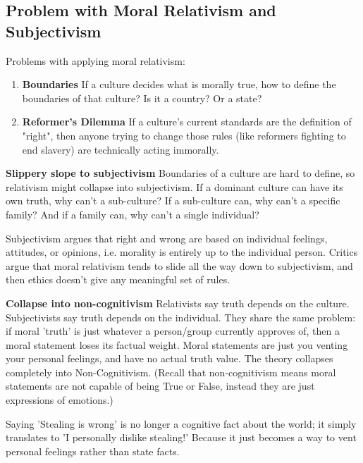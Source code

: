 \documentclass[12pt]{article}
\begin{document}
\subsection{Problem with Moral Relativism and Subjectivism}
Problems with applying moral relativism:
\begin{enumerate}
    \item \textbf{Boundaries} If a culture decides what is morally true, how to define the boundaries of that culture?
    Is it a country? Or a state?
    \item \textbf{Reformer's Dilemma} If a culture's current standards are the definition of "right",
    then anyone trying to change those rules (like reformers fighting to end slavery) are technically acting immorally.
\end{enumerate}
\textbf{Slippery slope to subjectivism} Boundaries of a culture are hard to define, so relativism might collapse into subjectivism.
If a dominant culture can have its own truth, why can't a sub-culture? If a sub-culture can, why can't a specific family? And if a family can, why can't a single individual?

\noindent Subjectivism argues that right and wrong are based on individual feelings, attitudes, or opinions,
i.e. morality is entirely up to the individual person.
Critics argue that moral relativism tends to slide all the way down to subjectivism, and then ethics doesn't give any meaningful set of rules.

\noindent\textbf{Collapse into non-cognitivism}
Relativists say truth depends on the culture. Subjectivists say truth depends on the individual.
They share the same problem: if moral 'truth' is just whatever a person/group currently approves of, then a moral statement loses its factual weight.
Moral statements are just you venting your personal feelings, and have no actual truth value.
The theory collapses completely into Non-Cognitivism.
(Recall that non-cognitivism means moral statements are not capable of being True or False,
instead they are just expressions of emotions.)

\noindent Saying 'Stealing is wrong' is no longer a cognitive fact about the world; it simply translates to 'I personally dislike stealing!' Because it just becomes a way to vent personal feelings rather than state facts.
\end{document}
